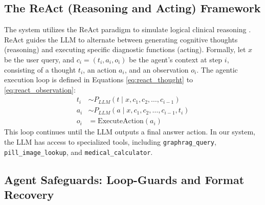 \documentclass[../main.tex]{subfiles}
\begin{document}
\subsection{The ReAct (Reasoning and Acting) Framework}

The system utilizes the ReAct paradigm to simulate logical clinical reasoning \cite{yao2022react}. ReAct guides the LLM to alternate between generating cognitive thoughts (reasoning) and executing specific diagnostic functions (acting). Formally, let $x$ be the user query, and $c_i = (t_i, a_i, o_i)$ be the agent's context at step $i$, consisting of a thought $t_i$, an action $a_i$, and an observation $o_i$. The agentic execution loop is defined in Equations \eqref{eq:react_thought} to \eqref{eq:react_observation}:
\begin{align}
t_i &\sim P_{LLM}(t \mid x, c_1, c_2, \dots, c_{i-1}) \label{eq:react_thought} \\
a_i &\sim P_{LLM}(a \mid x, c_1, c_2, \dots, c_{i-1}, t_i) \label{eq:react_action} \\
o_i &= \text{ExecuteAction}(a_i) \label{eq:react_observation}
\end{align}
This loop continues until the LLM outputs a final answer action. In our system, the LLM has access to specialized tools, including \texttt{graphrag\_query}, \texttt{pill\_image\_lookup}, and \texttt{medical\_calculator}.

\subsection{Agent Safeguards: Loop-Guards and Format Recovery}
\end{document}
